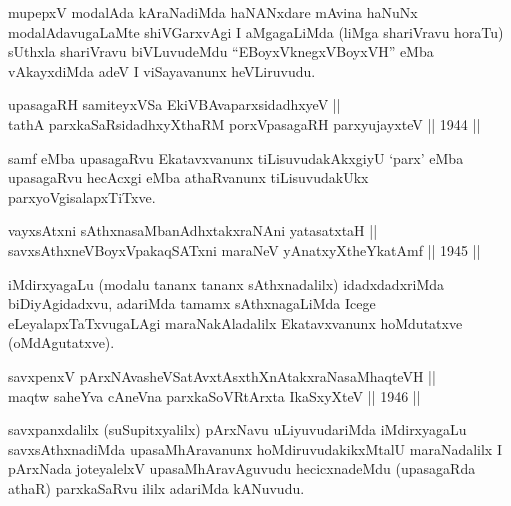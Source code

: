 \begin{artha}
mupepxV modalAda kAraNadiMda haNANxdare mAvina haNuNx
modalAdavugaLaMte shiVGarxvAgi I aMgagaLiMda (liMga shariVravu horaTu)
sUthxla shariVravu biVLuvudeMdu ``EBoyxV\s knegxVBoyxVH'' eMba vAkayxdiMda adeV I
viSayavanunx heVLiruvudu.
\end{artha}


\begin{shl}
upasagaRH samiteyxVSa EkiVBAvaparxsidadhxyeV || \\
tathA parxkaSaRsidadhxyXthaRM porxVpasagaRH parxyujayxteV \hfill || 1944 ||
  
\end{shl}

\begin{artha}
samf eMba upasagaRvu Ekatavxvanunx tiLisuvudakAkxgiyU `parx' eMba
upasagaRvu hecAcxgi eMba athaRvanunx tiLisuvudakUkx
parxyoVgisalapxTiTxve.
\end{artha}


\begin{shl}
vayxsAtxni sAthxnasaMbanAdhxtakxraNAni yatasatxtaH || \\
savxsAthxneVBoyxV\s pakaqSATxni maraNeV yAnatxyXtheYkatAmf \hfill || 1945 ||
  
\end{shl}

\begin{artha}
iMdirxyagaLu (modalu tananx tananx sAthxnadalilx) idadxdadxriMda
biDiyAgidadxvu, adariMda tamamx sAthxnagaLiMda Icege
eLeyalapxTaTxvugaLAgi maraNakAladalilx Ekatavxvanunx hoMdutatxve
(oMdAgutatxve).
\end{artha}


\begin{shl}
savxpenxV pArxNAvasheVSatAvxtAsxthXnAtakxraNasaMhaqteVH || \\
maqtw saheYva cAneVna parxkaSoVR\s tArxta IkaSxyXteV \hfill || 1946 ||
  
\end{shl}

\begin{artha}
savxpanxdalilx (suSupitxyalilx) pArxNavu uLiyuvudariMda iMdirxyagaLu
savxsAthxnadiMda upasaMhAravanunx hoMdiruvudakikxMtalU maraNadalilx I
pArxNada joteyalelxV upasaMhAravAguvudu hecicxnadeMdu (upasagaRda
athaR) parxkaSaRvu ililx adariMda kANuvudu.
\end{artha}

